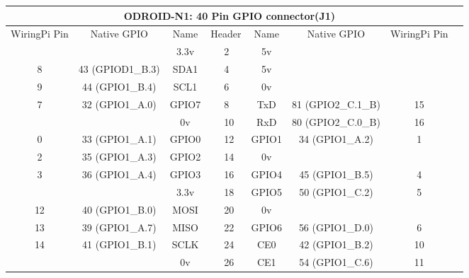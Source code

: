 \documentclass[11pt,a4paper]{article}
\begin{document}
\begin{sffamily}
\begin{center}
\begin{tabular}{|c|c|c||p{8mm}|p{8mm}||c|c|c|c|}
\hline
\multicolumn{8}{|c|}{\bfseries{ODROID-N1: 40 Pin GPIO connector(J1)}}\\
\hline
\hline
WiringPi Pin	& Native GPIO	& Name	& \multicolumn{2}{|c||}{Header}	& Name	& Native GPIO	& WiringPi Pin\\
\hline
\hline
	& 		& \textcolor{rtb-red}{3.3v}	& \raggedleft{1} &  2 & \textcolor{rtb-maroon}{5v}	& 		& \\
\hline
8	& 43 (GPIOD1{\_}B.3)	& \textcolor{rtb-aqua}{SDA1}	& \raggedleft{3} &  4 & \textcolor{rtb-maroon}{5v}		& 							& \\
\hline
9	& 44 (GPIO1{\_}B.4)		& \textcolor{rtb-aqua}{SCL1}	& \raggedleft{5} &  6 & \textcolor{rtb-black}{0v}		&			 				& \\
\hline
7	& 32 (GPIO1{\_}A.0)		& \textcolor{rtb-green}{GPIO7}	& \raggedleft{7} &  8 & \textcolor{rtb-yellow}{TxD}		& 81 (GPIO2{\_}C.1{\_}B)	& 15\\
\hline
	& 						& \textcolor{rtb-black}{0v}		& \raggedleft{9} & 10 & \textcolor{rtb-yellow}{RxD}		& 80 (GPIO2{\_}C.0{\_}B)	& 16\\
\hline
0	& 33 (GPIO1{\_}A.1)		& \textcolor{rtb-green}{GPIO0}	& \raggedleft{11} & 12 & \textcolor{rtb-green}{GPIO1}	& 34 (GPIO1{\_}A.2)			& 1\\
\hline
2	& 35 (GPIO1{\_}A.3)		& \textcolor{rtb-green}{GPIO2}	& \raggedleft{13} & 14 & \textcolor{rtb-black}{0v}		& 							& \\
\hline
3	& 36 (GPIO1{\_}A.4)		& \textcolor{rtb-green}{GPIO3}	& \raggedleft{15} & 16 & \textcolor{rtb-green}{GPIO4}	& 45 (GPIO1{\_}B.5)			& 4\\
\hline
	& 						& \textcolor{rtb-red}{3.3v}		& \raggedleft{17} & 18 & \textcolor{rtb-green}{GPIO5}	& 50 (GPIO1{\_}C.2)			& 5\\
\hline
12	& 40 (GPIO1{\_}B.0)		& \textcolor{rtb-teal}{MOSI}	& \raggedleft{19} & 20 & \textcolor{rtb-black}{0v}		& 							& \\
\hline
13	& 39 (GPIO1{\_}A.7)		& \textcolor{rtb-teal}{MISO}	& \raggedleft{21} & 22 & \textcolor{rtb-green}{GPIO6}	& 56 (GPIO1{\_}D.0)			& 6\\
\hline
14	& 41 (GPIO1{\_}B.1)		& \textcolor{rtb-teal}{SCLK}	& \raggedleft{23} & 24 & \textcolor{rtb-teal}{CE0}		& 42 (GPIO1{\_}B.2)			& 10\\
\hline
	& 						& \textcolor{rtb-black}{0v}		& \raggedleft{25} & 26 & \textcolor{rtb-teal}{CE1}		& 54 (GPIO1{\_}C.6)			& 11\\

\end{tabular}
\end{center}
\end{sffamily}
\end{document}
